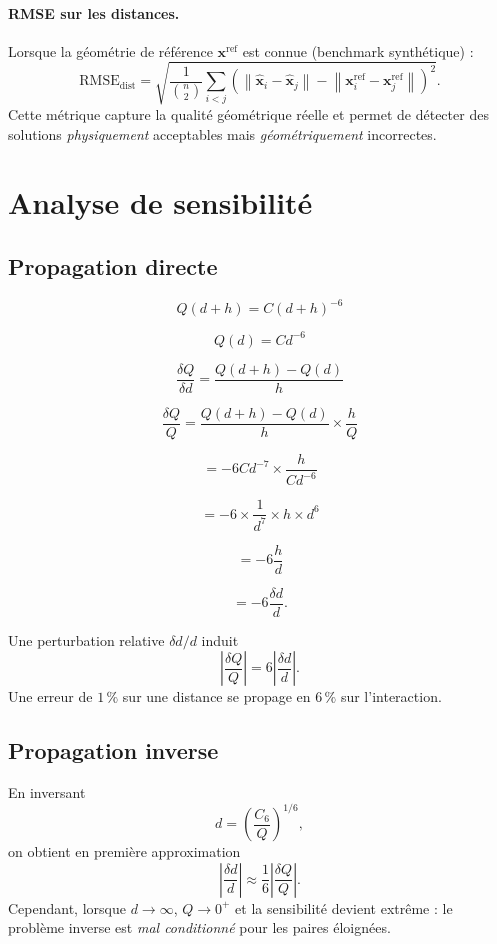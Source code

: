 \documentclass[11pt,a4paper]{article}
\theoremstyle{definition}
\theoremstyle{remark}
\newcommand{\norm}[1]{\left\|#1\right\|}
\newcommand{\cSix}{C_6}
\begin{document}
\paragraph{RMSE sur les distances.}
Lorsque la géométrie de référence $\mathbf{x}^{\mathrm{ref}}$ est connue
(benchmark synthétique) :
\begin{equation}
  \mathrm{RMSE}_{\mathrm{dist}}
  = \sqrt{\frac{1}{\binom{n}{2}}\sum_{i<j}
  \left(\norm{\hat{\mathbf{x}}_i-\hat{\mathbf{x}}_j}
       -\norm{\mathbf{x}^{\mathrm{ref}}_i-\mathbf{x}^{\mathrm{ref}}_j}\right)^2}.
\end{equation}
Cette métrique capture la qualité géométrique réelle et permet de détecter
des solutions \emph{physiquement} acceptables mais \emph{géométriquement}
incorrectes.

\section{Analyse de sensibilité}
\label{sec:sensibilite}

\subsection{Propagation directe}


\[
Q(d+h)=C(d+h)^{-6}
\]

\[
Q(d)=Cd^{-6}
\]

\[
\frac{\delta Q}{\delta d}
=
\frac{Q(d+h)-Q(d)}{h}
\]

\[
\frac{\delta Q}{Q}
=
\frac{Q(d+h)-Q(d)}{h}
\times
\frac{h}{Q}
\]

\[
=
-6Cd^{-7}
\times
\frac{h}{Cd^{-6}}
\]

\[
=
-6\times\frac{1}{d^{7}}\times h\times d^{6}
\]

\[
=
-6\frac{h}{d}
\]

\[
=
-6\frac{\delta d}{d}.
\]
  


 Une perturbation relative $\delta d/d$ induit
\begin{equation}
  \left|\frac{\delta Q}{Q}\right| = 6\left|\frac{\delta d}{d}\right|.
  \label{eq:sens-direct}
\end{equation}
Une erreur de $1\,\%$ sur une distance se propage en $6\,\%$ sur l'interaction.

\subsection{Propagation inverse}
En inversant
\begin{equation}
  d
  =
  \left(
    \frac{\cSix}{Q}
  \right)^{1/6},
\end{equation}
on obtient en première approximation
\begin{equation}
  \left|\frac{\delta d}{d}\right|
  \approx
  \frac{1}{6}
  \left|\frac{\delta Q}{Q}\right|.
  \label{eq:sens-inverse}
\end{equation}
Cependant, lorsque $d \to \infty$, $Q \to 0^+$ et la sensibilité devient
extrême : le problème inverse est \emph{mal conditionné} pour les paires
éloignées.
\end{document}

